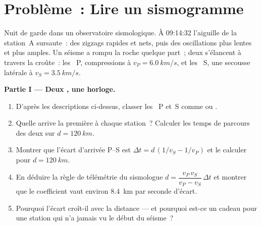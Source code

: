 \section{Problème~: Lire un sismogramme}

\begin{problem}
\label{pb:g12:mechanical-waves:1}
Nuit de garde dans un observatoire sismologique. À 09:14:32 l'aiguille
de la station~A sursaute~: des zigzags rapides et nets, puis des
oscillations plus lentes et plus amples. Un séisme a rompu la roche
quelque part~; deux  s'élancent à travers la croûte~: les
~P, compressions à $v_P = \qty{6.0}{km/s}$, et les ~S, une
secousse latérale à $v_S = \qty{3.5}{km/s}$.

\medskip
\noindent\textbf{Partie I --- Deux , une horloge.}
\begin{enumerate}
  \item D'après les descriptions ci-dessus, classer les ~P et~S
        comme  ou
        .
  \item Quelle  arrive la première à chaque station~? Calculer
        les temps de parcours des deux sur $d = \qty{120}{km}$.
  \item Montrer que l'écart d'arrivée P--S est
        $\Delta t = d\,(1/v_S - 1/v_P)$ et le calculer pour
        $d = \qty{120}{km}$.
  \item En déduire la règle de télémétrie du sismologue
        $d = \dfrac{v_P\,v_S}{v_P - v_S}\,\Delta t$ et montrer que le
        coefficient vaut environ \qty{8.4}{km} par seconde d'écart.
  \item Pourquoi l'écart croît-il avec la distance --- et pourquoi est-ce
        un cadeau pour une station qui n'a jamais vu le début du séisme~?
\end{enumerate}


\end{problem}

